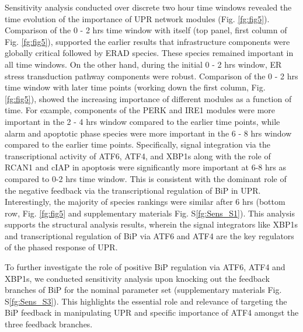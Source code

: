\documentclass[fleqn,10pt]{wlscirep}
\begin{document}
Sensitivity analysis conducted over discrete two hour time windows revealed the time evolution of the importance of UPR network modules (Fig. \ref{fg:fig5}). Comparison of the 0 - 2 hrs time window with itself (top panel, first column of Fig. \ref{fg:fig5}), supported the earlier results that infrastructure components were globally critical followed by ERAD species. These species remained important in all time windows. On the other hand, during the initial 0 - 2 hrs window, ER stress transduction pathway components were robust. Comparison of the 0 - 2 hrs time window with later time points (working down the first column, Fig. \ref{fg:fig5}), showed the increasing importance of different modules as a function of time. For example, components of the PERK and IRE1 modules were more important in the 2 - 4 hrs window compared to the earlier time points, while alarm and apoptotic phase species were more important in the 6 - 8 hrs window compared to the earlier time points. Specifically, signal integration via the transcriptional activity of ATF6, ATF4, and XBP1s along with the role of RCAN1 and cIAP in apoptosis were significantly more important at 6-8 hrs as compared to 0-2 hrs time window. This is consistent with the dominant role of the negative feedback via the transcriptional regulation of BiP in UPR. Interestingly, the majority of species rankings were similar after 6 hrs (bottom row,  Fig. \ref{fg:fig5} and supplementary materials Fig. S\ref{fg:Sens_S1}). 
This analysis supports the structural analysis results, wherein the signal integrators like XBP1s and transcriptional regulation of BiP via ATF6 and ATF4 are the key regulators of the phased response of UPR. 

To further investigate the role of positive BiP regulation via ATF6, ATF4 and XBP1s, we conducted sensitivity analysis upon knocking out the feedback branches of BiP for the nominal parameter set (supplementary materials Fig. S\ref{fg:Sens_S3}).
This highlights the essential role and relevance of targeting the BiP feedback in manipulating UPR and  specific importance of ATF4 amongst the three feedback branches.
\end{document}
